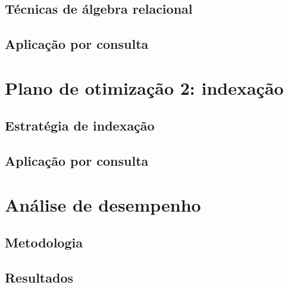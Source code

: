 \documentclass[12pt,a4paper]{article}
\begin{document}
\subsection{Técnicas de álgebra relacional}

\subsection{Aplicação por consulta}

\section{Plano de otimização 2: indexação}\label{sec:otim-indice}

\subsection{Estratégia de indexação}

\subsection{Aplicação por consulta}

\section{Análise de desempenho}\label{sec:desempenho}

\subsection{Metodologia}

\subsection{Resultados}
\end{document}

